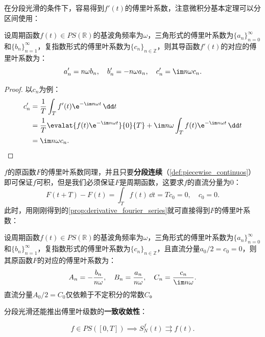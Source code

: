 在分段光滑的条件下，容易得到$f'(t)$的傅里叶系数，注意微积分基本定理可以分区间使用：
\begin{proposition}[导函数的傅里叶系数]
    \label{prop:derivative_fourier_series}
    设周期函数$f(t)\in PS(\mathbb{R})$的基波角频率为$\omega$，三角形式的傅里叶系数为$\{a_n\}_{n=0}^\infty$和$\{b_n\}_{n=1}^\infty$，复指数形式的傅里叶系数为$\{c_n\}_{n\in\mathbb{Z}}$，则其导函数$f'(t)$的对应的傅里叶系数为：
    \begin{equation}
        a'_n=n\omega b_n,\quad b'_n=-n\omega a_n,\quad c'_n=\im n\omega c_n.
    \end{equation}
\end{proposition}
\begin{proof}
    以$c_n$为例：
    \begin{align}
        c'_n&=\frac{1}{T}\int_{T}f'(t)\e^{-\im n\omega t}\,\dd t \nonumber \\
        &=\frac{1}{T}\evalat{f(t)\e^{-\im n\omega t}}{0}{T}+\im n\omega\int_{T}f(t)\e^{-\im n\omega t}\,\dd t \nonumber \\
        &=\im n\omega c_n.
    \end{align}
\end{proof}

$f$的原函数$F$的傅里叶系数同理，并且只要\textbf{分段连续}（\cref{def:piecewise_continuos}）即可保证$f$可积，但是我们必须保证$F$是周期函数，这要求$f$的直流分量为$0$：
\begin{equation}
    F(t+T)-F(t)=\int_{T}f(t)\,\dd t=Tc_0=0,\quad c_0=0.
\end{equation}
此时，用刚刚得到的\cref{prop:derivative_fourier_series}就可直接得到$F$的傅里叶系数：
\begin{proposition}[原函数的傅里叶系数]
    \label{prop:integral_fourier_series}
    设周期函数$f(t)\in PS(\mathbb{R})$的基波角频率为$\omega$，三角形式的傅里叶系数为$\{a_n\}_{n=0}^\infty$和$\{b_n\}_{n=1}^\infty$，复指数形式的傅里叶系数为$\{c_n\}_{n\in\mathbb{Z}}$，且直流分量$a_0/2=c_0=0$，则其原函数$F$的对应的傅里叶系数为：
    \begin{equation}
        A_n=-\frac{b_n}{n\omega},\quad B_n=\frac{a_n}{n\omega},\quad C_n=\frac{c_n}{\im n\omega}.
    \end{equation}
    直流分量$A_0/2=C_0$仅依赖于不定积分的常数$C$。
\end{proposition}

分段光滑还能推出傅里叶级数的\textbf{一致收敛性}：
\begin{theorem}\label{thm:uniform_convergency}
    \begin{equation}
        f\in PS([0,T])\implies S_N^f(t)\rightrightarrows f(t).
    \end{equation}
\end{theorem}

